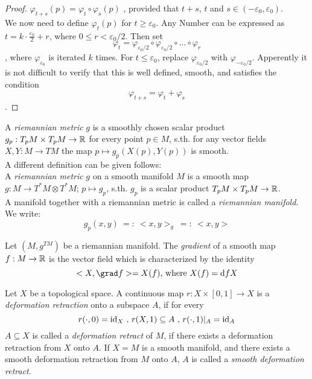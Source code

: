 \begin{proof}
   $\varphi_{t+s}(p) = \varphi_t \circ \varphi_s (p)$ , provided that $t+s$, $t$
   and $s \in (-\varepsilon_0, \varepsilon_0)$. \\ 
   We now need to define $\varphi_t(p)$ for $t \geq \varepsilon_0$. Any Number 
   can be expressed as $t = k \cdot \frac{\varepsilon_0}{2} + r$, where 
   $0 \leq r < \varepsilon_0/2$. Then set 
   \[ \varphi_t = 
   \varphi_{\varepsilon_0/2} \circ \varphi_{\varepsilon_0/2} \circ ... \circ \varphi_r \]
   , where $\varphi_{\varepsilon_0}$ is iterated $k$ times. For 
   $t \leq \varepsilon_0$, replace $\varphi_{\varepsilon_0/2}$ with 
   $\varphi_{-\varepsilon_0/2}$. 
   Apperently it is not difficult to verify that this is well defined, smooth,
   and satisfies the condition \[\varphi_{t+s} = \varphi_t + \varphi_s\].
\end{proof}

\begin{definition}
   \label{def:riemannian metric}
   A \textit{riemannian metric} $g$ is a smoothly chosen scalar product 
   $g_p: T_pM \times T_pM \rightarrow {\mathbb R}$ for every point $p \in M$, s.th. for 
   any vector fields $ X, Y: M \rightarrow TM $ the map 
   $ p \mapsto g_p(X(p), Y(p)) $ is smooth. \\
   A different definition can be given follows: \\
   A \textit{riemannian metric} $g$ on a smooth manifold $M$ is a smooth map 
   $g: M \rightarrow T^*M \otimes T^*M$; $p \mapsto g_p$,
   s.th. $g_p$ is a scalar product $T_pM \times T_pM \rightarrow {\mathbb R}$. \\
   A manifold together with a riemannian metric is called a 
   \textit{riemannian manifold}. \\
   We write:
   \[ g_p(x,y) \: =: \: <x, y>_g \: =: \: <x, y> \]
\end{definition}

\begin{definition}[gradient]
   \label{def:gradient}
   Let $(M, g^{TM})$ be a riemannian manifold. The \textit{gradient} of a smooth 
   map $f: M \rightarrow {\mathbb R}$ is the vector field which is characterized by the 
   identity 
   \[ <X, \grad f> = X(f) \text{, where } X(f) = \opd fX \]
\end{definition}

\begin{definition}
   \label{def:deformation retract}
   Let $X$ be a topological space. A continuous map $r: X \times [0, 1] \rightarrow X$ is 
   a \textit{deformation retraction} onto a subspace $A$, if for every 
   \[ r(\cdot,0) = {\operatorname{id}}_X \text{ , } r(X, 1) \subseteq A \text{ , } r(\cdot, 1)|_A = {\operatorname{id}}_A\]
   $A \subseteq X$ is called a \textit{deformation retract} of $M$, if there exists a
   deformation retraction from $X$ onto $A$.
   If $X = M$ is a smooth manifold, and there exists a smooth deformation
   retraction from $M$ onto $A$, $A$ is called a \textit{smooth deformation 
   retract}.
\end{definition}

